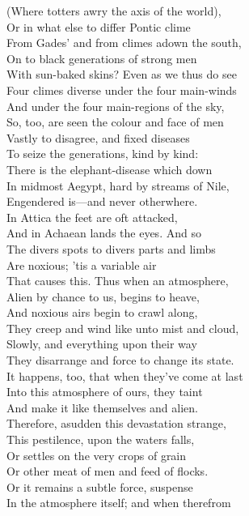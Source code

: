 (Where totters awry the axis of the world),\\
Or in what else to differ Pontic clime\\
From Gades' and from climes adown the south,\\
On to black generations of strong men\\
With sun-baked skins? Even as we thus do see\\
Four climes diverse under the four main-winds\\
And under the four main-regions of the sky,\\
So, too, are seen the colour and face of men\\
Vastly to disagree, and fixed diseases\\
To seize the generations, kind by kind:\\
There is the elephant-disease which down\\
In midmost Aegypt, hard by streams of Nile,\\
Engendered is—and never otherwhere.\\
In Attica the feet are oft attacked,\\
And in Achaean lands the eyes. And so\\
The divers spots to divers parts and limbs\\
Are noxious; 'tis a variable air\\
That causes this. Thus when an atmosphere,\\
Alien by chance to us, begins to heave,\\
And noxious airs begin to crawl along,\\
They creep and wind like unto mist and cloud,\\
Slowly, and everything upon their way\\
They disarrange and force to change its state.\\
It happens, too, that when they've come at last\\
Into this atmosphere of ours, they taint\\
And make it like themselves and alien.\\
Therefore, asudden this devastation strange,\\
This pestilence, upon the waters falls,\\
Or settles on the very crops of grain\\
Or other meat of men and feed of flocks.\\
Or it remains a subtle force, suspense\\
In the atmosphere itself; and when therefrom\\
